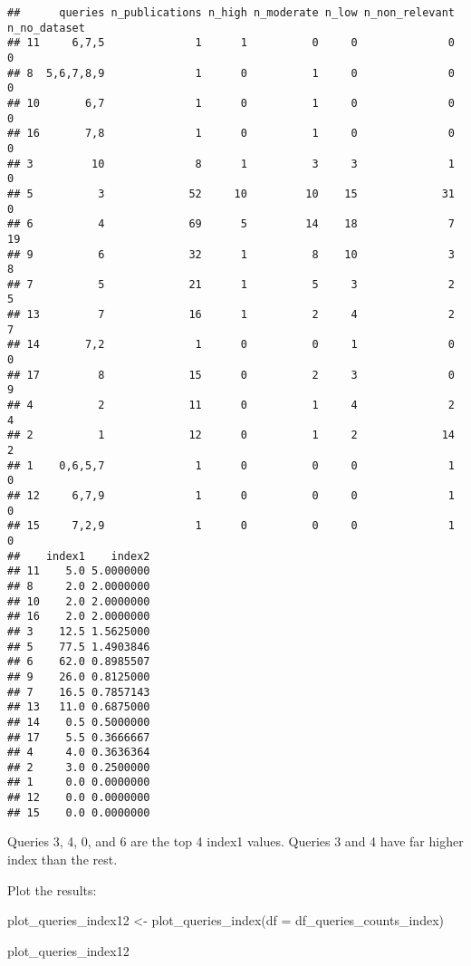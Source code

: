 \documentclass[
]{article}
\newenvironment{Shaded}{\begin{snugshade}}{\end{snugshade}}
\newcommand{\AttributeTok}[1]{\textcolor[rgb]{0.77,0.63,0.00}{#1}}
\newcommand{\FunctionTok}[1]{\textcolor[rgb]{0.00,0.00,0.00}{#1}}
\newcommand{\NormalTok}[1]{#1}
\newcommand{\OtherTok}[1]{\textcolor[rgb]{0.56,0.35,0.01}{#1}}
\begin{document}
\begin{verbatim}
##      queries n_publications n_high n_moderate n_low n_non_relevant n_no_dataset
## 11     6,7,5              1      1          0     0              0            0
## 8  5,6,7,8,9              1      0          1     0              0            0
## 10       6,7              1      0          1     0              0            0
## 16       7,8              1      0          1     0              0            0
## 3         10              8      1          3     3              1            0
## 5          3             52     10         10    15             31            0
## 6          4             69      5         14    18              7           19
## 9          6             32      1          8    10              3            8
## 7          5             21      1          5     3              2            5
## 13         7             16      1          2     4              2            7
## 14       7,2              1      0          0     1              0            0
## 17         8             15      0          2     3              0            9
## 4          2             11      0          1     4              2            4
## 2          1             12      0          1     2             14            2
## 1    0,6,5,7              1      0          0     0              1            0
## 12     6,7,9              1      0          0     0              1            0
## 15     7,2,9              1      0          0     0              1            0
##    index1    index2
## 11    5.0 5.0000000
## 8     2.0 2.0000000
## 10    2.0 2.0000000
## 16    2.0 2.0000000
## 3    12.5 1.5625000
## 5    77.5 1.4903846
## 6    62.0 0.8985507
## 9    26.0 0.8125000
## 7    16.5 0.7857143
## 13   11.0 0.6875000
## 14    0.5 0.5000000
## 17    5.5 0.3666667
## 4     4.0 0.3636364
## 2     3.0 0.2500000
## 1     0.0 0.0000000
## 12    0.0 0.0000000
## 15    0.0 0.0000000
\end{verbatim}

Queries 3, 4, 0, and 6 are the top 4 index1 values. Queries 3 and 4 have
far higher index than the rest.

Plot the results:

\begin{Shaded}
\begin{Highlighting}[]
\NormalTok{plot\_queries\_index12 }\OtherTok{\textless{}{-}} \FunctionTok{plot\_queries\_index}\NormalTok{(}\AttributeTok{df =}\NormalTok{ df\_queries\_counts\_index)}

\NormalTok{plot\_queries\_index12}
\end{Highlighting}
\end{Shaded}
\end{document}
